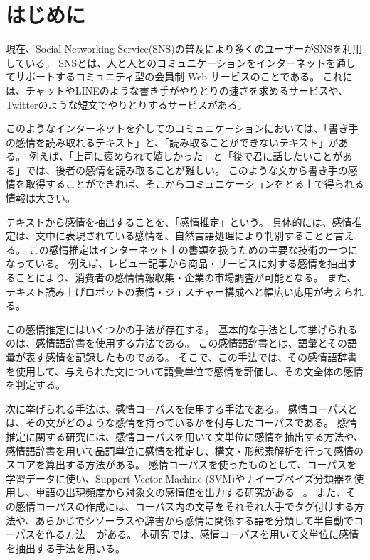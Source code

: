 \documentclass[11pt,a4j]{jsarticle}
\begin{document}
 \pagestyle{plain}
 \setcounter{page}{1}
 
 
\section{はじめに}\label{sec:begin}
 現在、Social Networking Service(SNS)の普及により多くのユーザーがSNSを利用している。
SNSとは、人と人とのコミュニケーションをインターネットを通してサポートするコミュニティ型の会員制 Web サービスのことである。
これには、チャットやLINE\raisebox{.5zw}{\scalebox{.5}{\textregistered}}のような書き手がやりとりの速さを求めるサービスや、Twitter\raisebox{.5zw}{\scalebox{.5}{\textregistered}}のような短文でやりとりするサービスがある。

このようなインターネットを介してのコミュニケーションにおいては、「書き手の感情を読み取れるテキスト」と、「読み取ることができないテキスト」がある。
例えば、「上司に褒められて嬉しかった」と「後で君に話したいことがある」では、後者の感情を読み取ることが難しい。
このような文から書き手の感情を取得することができれば、そこからコミュニケーションをとる上で得られる情報は大きい。

テキストから感情を抽出することを、「感情推定」という。
具体的には、感情推定は、文中に表現されている感情を、自然言語処理により判別することと言える。
この感情推定はインターネット上の書類を扱うための主要な技術の一つになっている。
例えば、レビュー記事から商品・サービスに対する感情を抽出することにより、消費者の感情情報収集・企業の市場調査が可能となる。
また、テキスト読み上げロボットの表情・ジェスチャー構成へと幅広い応用が考えられる。

この感情推定にはいくつかの手法が存在する。
基本的な手法として挙げられるのは、感情語辞書を使用する方法である。
この感情語辞書とは、語彙とその語彙が表す感情を記録したものである。
そこで、この手法では、その感情語辞書を使用して、与えられた文について語彙単位で感情を評価し、その文全体の感情を判定する。

次に挙げられる手法は、感情コーパスを使用する手法である。
感情コーパスとは、その文がどのような感情を持っているかを付与したコーパスである。
感情推定に関する研究には、感情コーパスを用いて文単位に感情を抽出する方法や、感情語辞書を用いて品詞単位に感情を推定し、構文・形態素解析を行って感情のスコアを算出する方法がある。
感情コーパスを使ったものとして、コーパスを学習データに使い、Support Vector Machine (SVM)やナイーブベイズ分類器を使用し、単語の出現頻度から対象文の感情値を出力する研究がある ~。
また、その感情コーパスの作成には、コーパス内の文章をそれぞれ人手でタグ付けする方法や、あらかじでシソーラスや辞書から感情に関係する語を分類して半自動でコーパスを作る方法 ~ がある。
本研究では、感情コーパスを用いて文単位に感情を抽出する手法を用いる。
\end{document}
